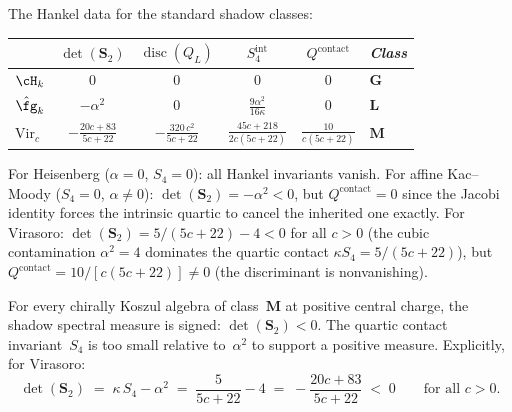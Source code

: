 \begin{example}
\label{ex:hankel-standard}
The Hankel data for the standard shadow classes:
\begin{center}
\small
\renewcommand{\arraystretch}{1.2}
\begin{tabular}{@{}lccccl@{}}
\toprule
& $\det(\mathbf{S}_2)$
  & $\operatorname{disc}(Q_L)$
  & $S_4^{\mathrm{int}}$
  & $Q^{\mathrm{contact}}$
  & \emph{Class} \\
\midrule
$\cH_k$
  & $0$ & $0$ & $0$ & $0$
  & $\mathbf{G}$ \\[3pt]
$\hat{\fg}_k$
  & $-\alpha^2$ & $0$
  & $\frac{9\alpha^2}{16\kappa}$
  & $0$
  & $\mathbf{L}$ \\[3pt]
$\mathrm{Vir}_c$
  & $-\frac{20c+83}{5c+22}$
  & $-\frac{320\,c^2}{5c+22}$
  & $\frac{45c+218}{2c(5c+22)}$
  & $\frac{10}{c(5c+22)}$
  & $\mathbf{M}$ \\
\bottomrule
\end{tabular}
\end{center}
\noindent
For Heisenberg ($\alpha = 0$, $S_4 = 0$):
all Hankel invariants vanish.
For affine Kac--Moody ($S_4 = 0$, $\alpha \neq 0$):
$\det(\mathbf{S}_2) = -\alpha^2 < 0$, but
$Q^{\mathrm{contact}} = 0$ since the Jacobi identity
forces the intrinsic quartic to cancel the inherited one
exactly.
For Virasoro:
$\det(\mathbf{S}_2) = 5/(5c{+}22) - 4 < 0$ for all $c > 0$
(the cubic contamination $\alpha^2 = 4$ dominates the
quartic contact $\kappa S_4 = 5/(5c{+}22)$),
but $Q^{\mathrm{contact}} = 10/[c(5c{+}22)] \neq 0$
(the discriminant is nonvanishing).
\end{example}

\begin{corollary}
\label{cor:signed-shadow-measure}
\ClaimStatusProvedHere
{}

For every chirally Koszul algebra of class~$\mathbf{M}$ at
positive central charge, the shadow spectral measure is signed:
$\det(\mathbf{S}_2) < 0$.
The quartic contact invariant~$S_4$ is too small
relative to~$\alpha^2$ to support a positive measure.
Explicitly, for Virasoro:
\begin{equation}\label{eq:signed-shadow-virasoro}
  \det(\mathbf{S}_2)
  \;=\;
  \kappa\,S_4 - \alpha^2
  \;=\;
  \frac{5}{5c+22} - 4
  \;=\;
  -\frac{20c+83}{5c+22}
  \;<\; 0
  \qquad \text{for all } c > 0.
\end{equation}
\end{corollary}

